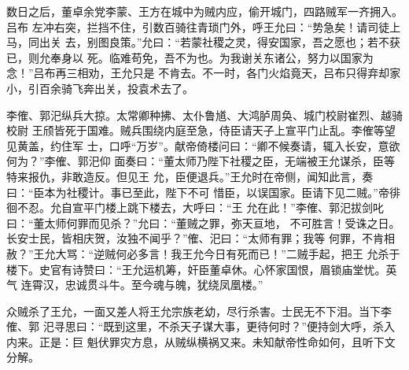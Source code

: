数日之后，董卓余党李蒙、王方在城中为贼内应，偷开城门，四路贼军一齐拥入。吕布
左冲右突，拦挡不住，引数百骑往青琐门外，呼王允曰：“势急矣！请司徒上马，同出关
去，别图良策。”允曰：“若蒙社稷之灵，得安国家，吾之愿也；若不获已，则允奉身以
死。临难苟免，吾不为也。为我谢关东诸公，努力以国家为念！”吕布再三相劝，王允只是
不肯去。不一时，各门火焰竟天，吕布只得弃却家小，引百余骑飞奔出关，投袁术去了。

李傕、郭汜纵兵大掠。太常卿种拂、太仆鲁馗、大鸿胪周奂、城门校尉崔烈、越骑校尉
王颀皆死于国难。贼兵围绕内庭至急，侍臣请天子上宣平门止乱。李傕等望见黄盖，约住军
士，口呼“万岁”。献帝倚楼问曰：“卿不候奏请，辄入长安，意欲何为？”李傕、郭汜仰
面奏曰：“董太师乃陛下社稷之臣，无端被王允谋杀，臣等特来报仇，非敢造反。但见王
允，臣便退兵。”王允时在帝侧，闻知此言，奏曰：“臣本为社稷计。事已至此，陛下不可
惜臣，以误国家。臣请下见二贼。”帝徘徊不忍。允自宣平门楼上跳下楼去，大呼曰：“王
允在此！”李傕、郭汜拔剑叱曰：“董太师何罪而见杀？”允曰：“董贼之罪，弥天亘地，
不可胜言！受诛之日。长安士民，皆相庆贺，汝独不闻乎？”傕、汜曰：“太师有罪；我等
何罪，不肯相赦？”王允大骂：“逆贼何必多言！我王允今日有死而已！”二贼手起，把王
允杀于楼下。史官有诗赞曰：“王允运机筹，奸臣董卓休。心怀家国恨，眉锁庙堂忧。英气
连霄汉，忠诚贯斗牛。至今魂与魄，犹绕凤凰楼。”

众贼杀了王允，一面又差人将王允宗族老幼，尽行杀害。士民无不下泪。当下李傕、郭
汜寻思曰：“既到这里，不杀天子谋大事，更待何时？”便持剑大呼，杀入内来。正是：巨
魁伏罪灾方息，从贼纵横祸又来。未知献帝性命如何，且听下文分解。
